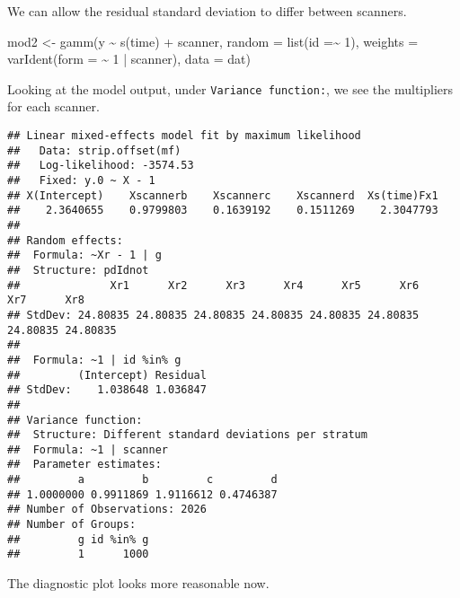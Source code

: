 \documentclass[
]{book}
\newenvironment{Shaded}{\begin{snugshade}}{\end{snugshade}}
\newcommand{\AttributeTok}[1]{\textcolor[rgb]{0.77,0.63,0.00}{#1}}
\newcommand{\DecValTok}[1]{\textcolor[rgb]{0.00,0.00,0.81}{#1}}
\newcommand{\FunctionTok}[1]{\textcolor[rgb]{0.00,0.00,0.00}{#1}}
\newcommand{\NormalTok}[1]{#1}
\newcommand{\OtherTok}[1]{\textcolor[rgb]{0.56,0.35,0.01}{#1}}
\newcommand{\SpecialCharTok}[1]{\textcolor[rgb]{0.00,0.00,0.00}{#1}}
\newcommand{\StringTok}[1]{\textcolor[rgb]{0.31,0.60,0.02}{#1}}
\begin{document}
We can allow the residual standard deviation to differ between scanners.

\begin{Shaded}
\begin{Highlighting}[]
\NormalTok{mod2 }\OtherTok{\textless{}{-}} \FunctionTok{gamm}\NormalTok{(y }\SpecialCharTok{\textasciitilde{}} \FunctionTok{s}\NormalTok{(time) }\SpecialCharTok{+}\NormalTok{ scanner, }\AttributeTok{random =} \FunctionTok{list}\NormalTok{(}\AttributeTok{id =}\SpecialCharTok{\textasciitilde{}} \DecValTok{1}\NormalTok{), }
             \AttributeTok{weights =} \FunctionTok{varIdent}\NormalTok{(}\AttributeTok{form =} \SpecialCharTok{\textasciitilde{}} \DecValTok{1}  \SpecialCharTok{|}\NormalTok{ scanner), }\AttributeTok{data =}\NormalTok{ dat)}
\end{Highlighting}
\end{Shaded}

Looking at the model output, under \texttt{Variance\ function:}, we see the multipliers for each scanner.

\begin{Shaded}
\end{Shaded}

\begin{verbatim}
## Linear mixed-effects model fit by maximum likelihood
##   Data: strip.offset(mf) 
##   Log-likelihood: -3574.53
##   Fixed: y.0 ~ X - 1 
## X(Intercept)    Xscannerb    Xscannerc    Xscannerd  Xs(time)Fx1 
##    2.3640655    0.9799803    0.1639192    0.1511269    2.3047793 
## 
## Random effects:
##  Formula: ~Xr - 1 | g
##  Structure: pdIdnot
##              Xr1      Xr2      Xr3      Xr4      Xr5      Xr6      Xr7      Xr8
## StdDev: 24.80835 24.80835 24.80835 24.80835 24.80835 24.80835 24.80835 24.80835
## 
##  Formula: ~1 | id %in% g
##         (Intercept) Residual
## StdDev:    1.038648 1.036847
## 
## Variance function:
##  Structure: Different standard deviations per stratum
##  Formula: ~1 | scanner 
##  Parameter estimates:
##         a         b         c         d 
## 1.0000000 0.9911869 1.9116612 0.4746387 
## Number of Observations: 2026
## Number of Groups: 
##         g id %in% g 
##         1      1000
\end{verbatim}

The diagnostic plot looks more reasonable now.

\begin{Shaded}
\end{Shaded}
\end{document}
